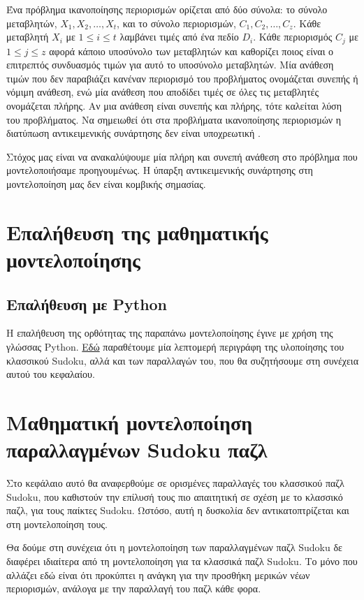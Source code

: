 \documentclass[oneside,12pt]{book}
\theoremstyle{definition}
\begin{document}
Ένα πρόβλημα ικανοποίησης περιορισμών ορίζεται από δύο σύνολα: το σύνολο μεταβλητών, \(X_1, X_2, \dots, X_t\), και το σύνολο περιορισμών, \(C_1, C_2, \dots, C_z\). Κάθε μεταβλητή \(X_i\) με \(1 \leq i \leq t\) λαμβάνει τιμές από ένα πεδίο \(D_i\). Κάθε περιορισμός \(C_j\) με \(1 \leq j \leq z\) αφορά κάποιο υποσύνολο των μεταβλητών και καθορίζει ποιος είναι ο επιτρεπτός συνδυασμός τιμών για αυτό το υποσύνολο μεταβλητών. Μία ανάθεση τιμών που δεν παραβιάζει κανέναν περιορισμό του προβλήματος ονομάζεται συνεπής ή νόμιμη ανάθεση, ενώ μία ανάθεση που αποδίδει τιμές σε όλες τις μεταβλητές ονομάζεται πλήρης. Αν μια ανάθεση είναι συνεπής και πλήρης, τότε καλείται λύση του προβλήματος. Να σημειωθεί ότι στα προβλήματα ικανοποίησης περιορισμών η διατύπωση αντικειμενικής συνάρτησης δεν είναι υποχρεωτική \cite{4}. \par

Στόχος μας είναι να ανακαλύψουμε μία πλήρη και συνεπή ανάθεση στο πρόβλημα που μοντελοποιήσαμε προηγουμένως. Η ύπαρξη αντικειμενικής συνάρτησης στη μοντελοποίηση μας δεν είναι κομβικής σημασίας.

\section{Επαλήθευση της μαθηματικής μοντελοποίησης}

\subsection{Επαλήθευση με Python}

Η επαλήθευση της ορθότητας της παραπάνω μοντελοποίησης έγινε με χρήση της γλώσσας Python.  \href{../src/presentation.pdf}{Εδώ} παραθέτουμε μία λεπτομερή περιγράφη της υλοποίησης του κλασσικού Sudoku, αλλά και των παραλλαγών του, που θα συζητήσουμε στη συνέχεια αυτού του κεφαλαίου. \par

\section{Μαθηματική μοντελοποίηση παραλλαγμένων Sudoku παζλ}

Στο κεφάλαιο αυτό θα αναφερθούμε σε ορισμένες παραλλαγές του κλασσικού παζλ Sudoku, που καθιστούν την επίλυσή τους πιο απαιτητική σε σχέση με το κλασσικό παζλ, για τους παίκτες Sudoku. Ωστόσο, αυτή η δυσκολία δεν αντικατοπτρίζεται και στη μοντελοποίηση τους. \par

Θα δούμε στη συνέχεια ότι η μοντελοποίηση των παραλλαγμένων παζλ Sudoku δε διαφέρει ιδιαίτερα από τη μοντελοποίηση για τα κλασσικά παζλ Sudoku. Το μόνο που αλλάζει εδώ είναι ότι προκύπτει η ανάγκη για την προσθήκη μερικών νέων περιορισμών, ανάλογα με την παραλλαγή του παζλ κάθε φορα. \par
\end{document}

